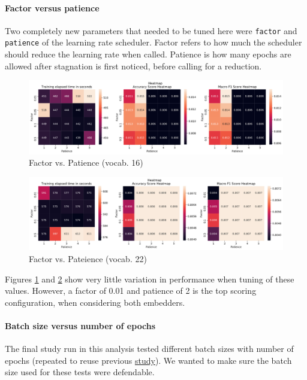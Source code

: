 \paragraph{Factor versus patience}
Two completely new parameters that needed to be tuned here were \texttt{factor} and \texttt{patience} of the learning rate scheduler. 
Factor refers to how much the scheduler should reduce the learning rate when called. Patience is how many epochs are allowed after stagnation is first noticed, before calling for a reduction. 

\begin{figure}[H]
    \centering
    \includegraphics[width=1\linewidth]{pictures/ex6_heatmap_16_FactorPatience.png}
    \caption{Factor vs. Patience (vocab. 16)}
    \label{fig:factor_16_rnn}
\end{figure}

\begin{figure}[H]
    \centering
    \includegraphics[width=1\linewidth]{pictures/ex6_heatmap_22_FactorPatience.png}
    \caption{Factor vs. Pateience (vocab. 22)}
    \label{fig:factor_22_rnn}
\end{figure}

Figures \ref{fig:factor_16_rnn} and \ref{fig:factor_22_rnn} show very little variation in performance when tuning of these values. However, a factor of 0.01 and patience of 2 is the top scoring configuration, when considering both embedders. 

\paragraph{Batch size versus number of epochs}
The final study run in this analysis tested different batch sizes with number of epochs (repeated to reuse previous \href{https://github.uio.no/fabior/IN5550/blob/master/Oblig2/packages/studies.py}{study}). We wanted to make sure the batch size used for these tests were defendable. 

